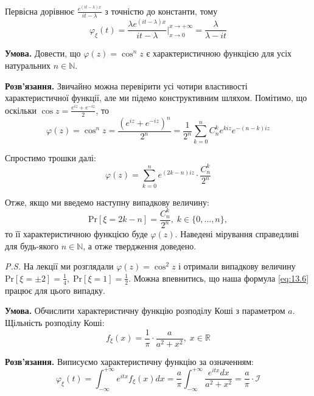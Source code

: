 \documentclass[oneside,solution]{karazin-prob-theory-assign}
\begin{document}
Первісна дорівнює $\frac{e^{(it-\lambda)x}}{it-\lambda}$ з точністю до константи, тому
\begin{equation}
    \varphi_{\xi}(t) = \frac{\lambda e^{(it-\lambda)x}}{it-\lambda}\Big|_{x \to 0}^{x \to +\infty} = \boxed{\frac{\lambda}{\lambda - it}}
\end{equation}


\hspace{20px}\textbf{Умова.} Довести, що $\varphi(z) = \cos^n z$ є характеристичною функцією для усіх натуральних $n \in \mathbb{N}$. 

\textbf{Розв'язання.} Звичайно можна перевірити усі чотири властивості характеристичної функції, але ми підемо конструктивним шляхом. Помітимо, що оскільки $\cos z = \frac{e^{iz}+e^{-iz}}{2}$, то
\begin{equation}
    \varphi(z) = \cos^n z = \frac{(e^{iz}+e^{-iz})^n}{2^n} = \frac{1}{2^n}\sum_{k=0}^n C_n^k e^{kiz}e^{-(n-k)iz}
\end{equation}

Спростимо трошки далі:
\begin{equation}
    \varphi(z) = \sum_{k=0}^{n} e^{(2k-n)iz} \cdot \frac{C_n^k}{2^n}
\end{equation}

Отже, якщо ми введемо наступну випадкову величину:
\begin{equation}\label{eq:13.6}
    \text{Pr}[\xi = 2k-n] = \frac{C_n^k}{2^n}, \; k \in \{0,\dots,n\},
\end{equation}
то її характеристичною функцією буде $\varphi(z)$. Наведені мірування справедливі для будь-якого $n \in \mathbb{N}$, а отже твердження доведено.

\textit{P.S.} На лекції ми розглядали $\varphi(z) = \cos^2 z$ і отримали випадкову величину $\text{Pr}[\xi=\pm 2] = \frac{1}{4}, \; \text{Pr}[\xi=1] = \frac{1}{2}$. Можна впевнитись, що наша формула \ref{eq:13.6} працює для цього випадку.
 

\hspace{20px}\textbf{Умова.} Обчислити характеристичну функцію розподілу Коші з параметром $a$. Щільність розподілу Коші:
\begin{equation}
    f_{\xi}(x) = \frac{1}{\pi} \cdot \frac{a}{a^2+x^2}, \; x \in \mathbb{R}
\end{equation}

\textbf{Розв'язання.} Виписуємо характеристичну функцію за означенням:
\begin{equation}
    \varphi_{\xi}(t) = \int_{-\infty}^{+\infty}e^{itx}f_{\xi}(x)dx = \frac{a}{\pi}\int_{-\infty}^{+\infty} \frac{e^{itx}dx}{a^2+x^2} = \frac{a}{\pi} \cdot \mathcal{I}
\end{equation}
\end{document}
